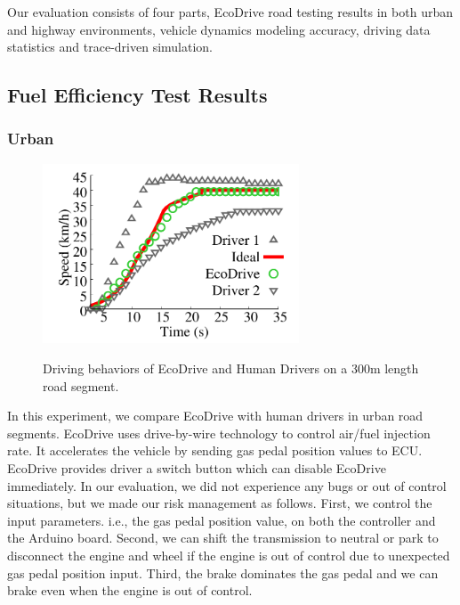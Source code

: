 
Our evaluation consists of four parts, 
EcoDrive road testing results in both urban and highway environments, 
vehicle dynamics modeling accuracy, 
driving data statistics and trace-driven simulation. 


\subsection{Fuel Efficiency Test Results}



\subsubsection{Urban}

\begin{figure}[!htbp]
\begin{center}
\includegraphics[width=3.0in,angle=0]{Figs/EcoDrive/evaluation/sampledrive240.pdf}
\vspace{-0.0cm}
\caption{Driving behaviors of EcoDrive and Human Drivers on a 300m length road segment.}
\vspace{-0.6cm}
\label{sampledrive}
\end{center}
\end{figure}


In this experiment, we compare EcoDrive with human drivers in urban
road segments.  
EcoDrive uses drive-by-wire technology to control air/fuel injection rate. 
It accelerates the vehicle by sending gas pedal position values to ECU. 
EcoDrive provides driver a switch button which can disable EcoDrive immediately. 
In our evaluation, we did not experience any bugs or out of control situations, 
but we made our risk management as follows. 
First, we control the input parameters. i.e., the gas pedal position value, 
on both the controller and the Arduino board. 
Second, we can shift the transmission to neutral or park to disconnect the engine and wheel
if the engine is out of control due to unexpected gas pedal position input. 
Third, the brake dominates the gas pedal and we can brake
even when the engine is out of control. 




